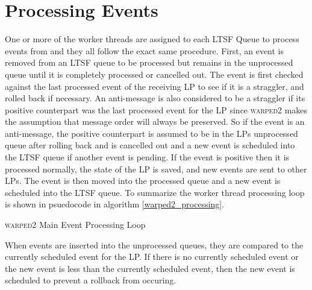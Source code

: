 \documentclass[11pt]{book}
\begin{document}
\section{Processing Events}

One or more of the worker threads are assigned to each LTSF Queue to process events from
and they all follow the exact same procedure. First, an event is removed from an LTSF
queue to be processed but remains in the unprocessed queue until it is completely processed or
cancelled out. The event is first checked against the last processed event of the receiving LP
to see if it is a straggler, and rolled back if necessary. An anti-message is also considered to
be a straggler if its positive counterpart was the last processed event for the LP since
\textsc{warped2} makes the assumption that message order will always be preserved.
So if the event is an anti-message, the positive counterpart is assumed to be in the LPs
unprocessed queue after rolling back and is cancelled out and a new event is scheduled into the
LTSF queue if another event is pending. If the event is positive then it is processed normally,
the state of the LP is saved, and new events are sent to other LPs. The event is then moved
into the processed queue and a new event is scheduled into the LTSF queue. To summarize the
worker thread processing loop is shown in psuedocode in algorithm \ref{warped2_processing}.

\begin{algorithm}
\DontPrintSemicolon
{}
\SetAlgoVlined


\caption{\textsc{warped2} Main Event Processing Loop}\label{warped2_processing}
\end{algorithm}

When events are inserted into the unprocessed queues, they are compared to the currently
scheduled event for the LP. If there is no currently scheduled event or the new event is less
than the currently scheduled event, then the new event is scheduled to prevent a rollback from
occuring.
\end{document}
